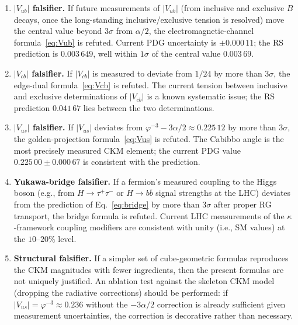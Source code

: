 \documentclass[11pt]{article}
\theoremstyle{remark}
\newcommand{\phig}{\varphi}
\begin{document}
\begin{enumerate}
  \item \textbf{$|V_{ub}|$ falsifier.}
    If future measurements of $|V_{ub}|$ (from inclusive and
    exclusive $B$ decays, once the long-standing
    inclusive/exclusive tension is resolved) move the central
    value beyond $3\sigma$ from $\alpha/2$, the
    electromagnetic-channel formula~\eqref{eq:Vub} is refuted.
    Current PDG uncertainty is $\pm 0.000\,11$; the RS
    prediction is $0.003\,649$, well within $1\sigma$ of the
    central value $0.003\,69$.

  \item \textbf{$|V_{cb}|$ falsifier.}
    If $|V_{cb}|$ is measured to deviate from $1/24$ by more
    than $3\sigma$, the edge-dual formula~\eqref{eq:Vcb} is
    refuted.  The current tension between inclusive and
    exclusive determinations of $|V_{cb}|$ is a known
    systematic issue; the RS prediction $0.041\,67$ lies
    between the two determinations.

  \item \textbf{$|V_{us}|$ falsifier.}
    If $|V_{us}|$ deviates from
    $\phig^{-3}-3\alpha/2\approx 0.225\,12$ by more than
    $3\sigma$, the golden-projection formula~\eqref{eq:Vus}
    is refuted.  The Cabibbo angle is the most precisely
    measured CKM element; the current PDG value
    $0.225\,00\pm 0.000\,67$ is consistent with the prediction.

  \item \textbf{Yukawa-bridge falsifier.}
    If a fermion's measured coupling to the Higgs boson
    (e.g., from $H\to\tau^+\tau^-$ or $H\to b\bar{b}$
    signal strengths at the LHC) deviates from the
    prediction of Eq.~\eqref{eq:bridge} by more than $3\sigma$
    after proper RG transport, the bridge formula is refuted.
    Current LHC measurements of the $\kappa$-framework
    coupling modifiers are consistent with unity (i.e.,
    SM values) at the $10$--$20\%$ level.

  \item \textbf{Structural falsifier.}
    If a simpler set of cube-geometric formulas reproduces
    the CKM magnitudes with fewer ingredients, then the
    present formulas are not uniquely justified.  An ablation
    test against the skeleton CKM model (dropping the radiative
    corrections) should be performed: if
    $|V_{us}|=\phig^{-3}\approx 0.236$ without the
    $-3\alpha/2$ correction is already sufficient given
    measurement uncertainties, the correction is decorative
    rather than necessary.
\end{enumerate}
\end{document}
